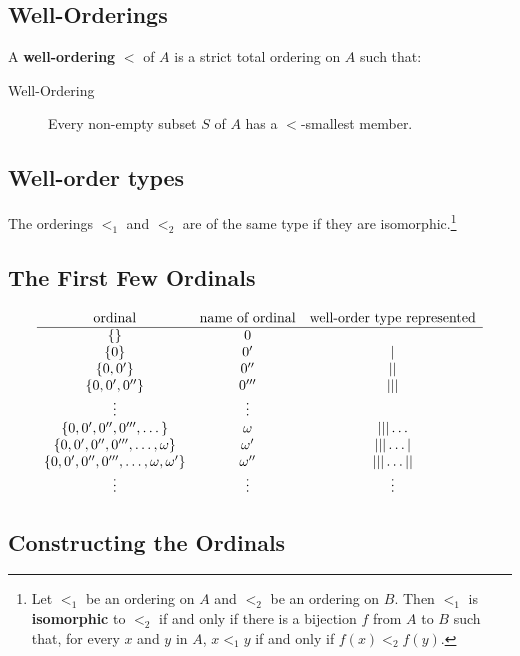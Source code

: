 \documentclass[12pt]{extarticle}
\begin{document}
\subsection{Well-Orderings}

A \textbf{well-ordering} $<$ of $A$ is a strict total ordering on $A$ such that:


\begin{description}
\item[Well-Ordering]   Every non-empty subset $S$ of $A$ has a $<$-smallest member. 
\end{description}

\subsection{Well-order types}

The orderings $<_1$ and $<_2$ are of the same type if they are isomorphic.\footnote{Let $<_1$ be an ordering on $A$ and $<_2$ be an ordering on $B$. Then  $<_1$ is \textbf{isomorphic} to $<_2$ if and only if there is a bijection $f$ from $A$ to $B$ such that, for every $x$ and $y$ in $A$, $x<_1y$ if and only if $f(x)<_2f(y)$.
}


\subsection{The First Few Ordinals}

\[
\begin{array}{ccc}
\text{ordinal} & \text{name of ordinal} & \text{well-order type represented}\\ \hline
\left\{\right\} &0 & \ \\
\left\{0\right\} &0'  & |   \\
\left\{0,0'\right\} &0''  & | |  \\
\left\{0,0',0''\right\} &0''' & | | |  \\
\vdots  & \vdots\\
\left\{0,0',0'',0''',\dots\right\} &\omega  & | | |  \dots   \\
\left\{0,0',0'',0''',\dots,\omega\right\} &\omega'  & | |  | \dots |  \\
\left\{0,0',0'',0''',\dots,\omega, \omega'\right\} &\omega''  & | | | \dots | |  \\
\vdots & \vdots & \vdots \\
\end{array}
\]

\subsection{Constructing the Ordinals}
\end{document}
